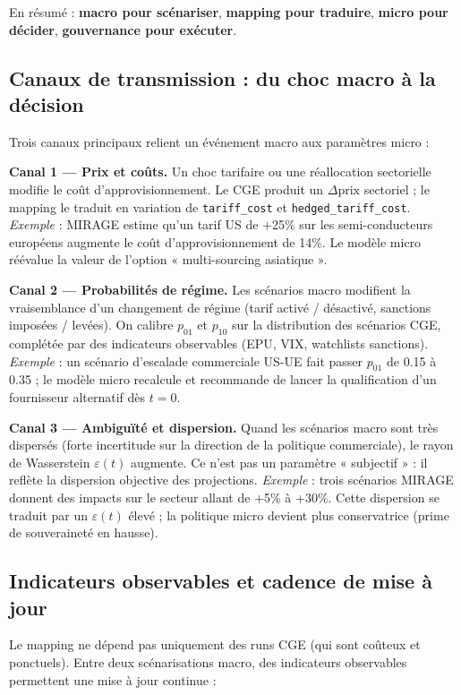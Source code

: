 \documentclass[11pt,a4paper]{article}
\begin{document}
En résumé : \textbf{macro pour scénariser}, \textbf{mapping pour traduire}, \textbf{micro pour décider}, \textbf{gouvernance pour exécuter}.

\subsection{Canaux de transmission : du choc macro à la décision}

Trois canaux principaux relient un événement macro aux paramètres micro :

\medskip
\noindent\textbf{Canal 1 — Prix et coûts.}
Un choc tarifaire ou une réallocation sectorielle modifie le coût d’approvisionnement.
Le CGE produit un \(\Delta\text{prix}\) sectoriel ; le mapping le traduit en variation de \texttt{tariff\_cost} et \texttt{hedged\_tariff\_cost}.
\emph{Exemple} : MIRAGE estime qu’un tarif US de +25\% sur les semi-conducteurs européens augmente le coût d’approvisionnement de 14\%. Le modèle micro réévalue la valeur de l’option « multi-sourcing asiatique ».

\medskip
\noindent\textbf{Canal 2 — Probabilités de régime.}
Les scénarios macro modifient la vraisemblance d’un changement de régime (tarif activé / désactivé, sanctions imposées / levées).
On calibre \(p_{01}\) et \(p_{10}\) sur la distribution des scénarios CGE, complétée par des indicateurs observables (EPU, VIX, watchlists sanctions).
\emph{Exemple} : un scénario d’escalade commerciale US-UE fait passer \(p_{01}\) de 0.15 à 0.35 ; le modèle micro recalcule et recommande de lancer la qualification d’un fournisseur alternatif dès \(t=0\).

\medskip
\noindent\textbf{Canal 3 — Ambiguïté et dispersion.}
Quand les scénarios macro sont très dispersés (forte incertitude sur la direction de la politique commerciale), le rayon de Wasserstein \(\varepsilon(t)\) augmente.
Ce n’est pas un paramètre « subjectif » : il reflète la dispersion objective des projections.
\emph{Exemple} : trois scénarios MIRAGE donnent des impacts sur le secteur allant de +5\% à +30\%. Cette dispersion se traduit par un \(\varepsilon(t)\) élevé ; la politique micro devient plus conservatrice (prime de souveraineté en hausse).

\subsection{Indicateurs observables et cadence de mise à jour}

Le mapping ne dépend pas uniquement des runs CGE (qui sont coûteux et ponctuels). Entre deux scénarisations macro, des indicateurs observables permettent une mise à jour continue :
\end{document}
